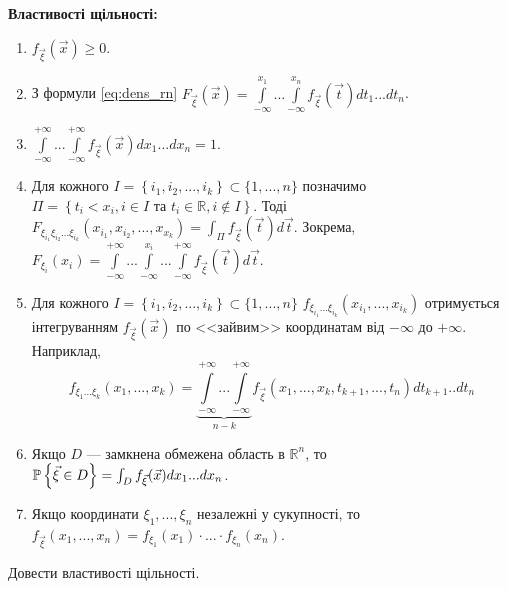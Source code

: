 \noindent \textbf{Властивості щільності:}
\begin{enumerate}
    \item $f_{\vec{\xi}}(\vec{x}) \geq 0$.
    \item З формули \eqref{eq:dens_rn} $F_{\vec{\xi}}(\vec{x}) = 
    \int\limits_{-\infty}^{x_1}...\int\limits_{-\infty}^{x_n}
    f_{\vec{\xi}} (\vec{t})dt_1...dt_n$.
    \item $\int\limits_{-\infty}^{+\infty}...\int\limits_{-\infty}^{+\infty}
    f_{\vec{\xi}} (\vec{x})dx_1...dx_n = 1$.
    \item Для кожного $I = \left\{i_1, i_2, ..., i_k\right\} \subset \{1,...,n\}$
    позначимо $\Pi = \left\{t_{i} < x_{i} , i \in I \text{ та } t_i \in \mathbb{R}, i \notin I\right\}$.
    Тоді $F_{\xi_{i_1} \xi_{i_2} ... \xi_{i_k}}(x_{i_1}, x_{i_2}, ..., x_{x_k}) = \int_{\Pi} f_{\vec{\xi}}(\vec{t}) d\vec{t}$.
    Зокрема, 
    $F_{\xi_i}(x_i) = \int\limits_{-\infty}^{+\infty}...
    \int\limits_{-\infty}^{x_i}...\int\limits_{-\infty}^{+\infty}
    f_{\vec{\xi}} (\vec{t})d\vec{t}$.

    \item Для кожного $I = \left\{i_1, i_2, ..., i_k\right\} \subset \{1,...,n\}$ $f_{\xi_{i_1}...\xi_{i_k}}(x_{i_1}, ..., x_{i_k})$ отримується
    інтегруванням $f_{\vec{\xi}}(\vec{x})$ по <<зайвим>> координатам від $-\infty$ до $+\infty$. Наприклад, 
    $$f_{\xi_1 ... \xi_k} (x_1, ..., x_k) = 
    \underbrace{
        \int\limits_{-\infty}^{+\infty} 
        ... 
        \int\limits_{-\infty}^{+\infty}
    }_{n-k} f_{\vec{\xi}}(x_1,...,x_k, t_{k+1}, ..., t_n) dt_{k+1}..dt_n$$
    \item Якщо $D$ --- замкнена обмежена область в $\mathbb{R}^n$, то
    $\P\left\{\vec{\xi} \in D\right\} = \int_D f_{\vec{\xi}}(\vec{x})
    dx_1 ... dx_n$.
    \item Якщо координати $\xi_1, ..., \xi_n$ незалежні у сукупності, то 
    $f_{\vec{\xi}} (x_1, ..., x_n) = f_{\xi_1}(x_1) \cdot ... \cdot f_{\xi_n}(x_n)$.
\end{enumerate}
\begin{exercise}
    Довести властивості щільності.
\end{exercise}